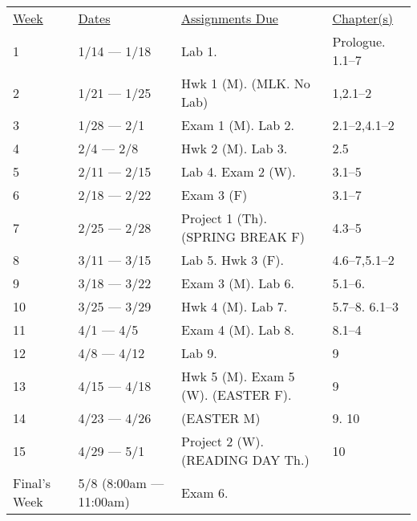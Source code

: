 \documentclass[10pt]{article}
\begin{document}
\begin{center}
\begin{tabular}{llll}
\underline{Week} & \underline{Dates} & \underline{Assignments Due} & \underline{Chapter(s)}\\
1 & 1/14 --- 1/18 & Lab 1.  &  Prologue. 1.1--7\\
2 & 1/21 --- 1/25 &  Hwk 1 (M). (MLK. No Lab) &  1,2.1--2 \\
3 & 1/28 --- 2/1 & Exam 1 (M). Lab 2. &  2.1--2,4.1--2 \\
4 & 2/4 --- 2/8 & Hwk 2 (M). Lab 3. & 2.5 \\
5 & 2/11 --- 2/15 & Lab 4. Exam 2 (W). & 3.1--5\\
6 & 2/18 --- 2/22 & Exam 3 (F) & 3.1--7\\
7 & 2/25 --- 2/28 & Project 1 (Th). (SPRING BREAK F) & 4.3--5  \\
8 & 3/11 --- 3/15 & Lab 5. Hwk 3 (F). & 4.6--7,5.1--2 \\
9 & 3/18 --- 3/22 & Exam 3 (M). Lab 6.  & 5.1--6. \\
10 & 3/25 --- 3/29 & Hwk 4 (M). Lab 7.  & 5.7--8. 6.1--3 \\
11 & 4/1 --- 4/5 &  Exam 4 (M). Lab 8. & 8.1--4 \\
12 & 4/8 --- 4/12 &  Lab 9. & 9 \\
13 & 4/15 --- 4/18 & Hwk 5 (M). Exam 5 (W). (EASTER F).&  9 \\
14 & 4/23 --- 4/26 & (EASTER M) & 9. 10 \\
15 & 4/29 --- 5/1 & Project 2 (W). (READING DAY Th.)  & 10 \\
Final's Week & 5/8 (8:00am --- 11:00am) & Exam 6.  &  \\
\end{tabular}
\end{center}
\end{document}
